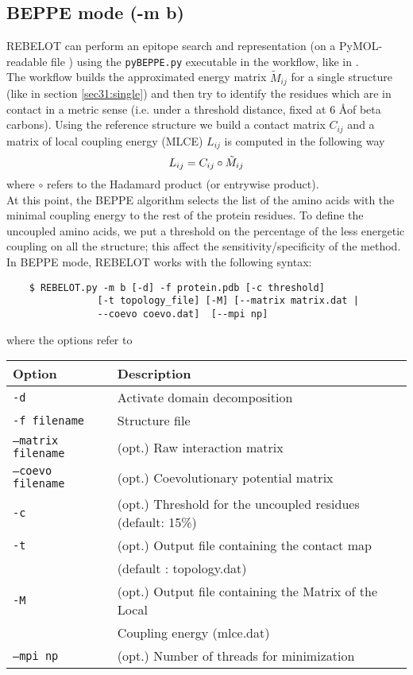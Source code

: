 \documentclass[a4paper,12pt]{book}
\begin{document}
\subsection{BEPPE mode (-m b)}
\label{sec34:beppe}
REBELOT can perform an epitope search and representation (on a PyMOL-readable file \cite{PyMOL}) using the \texttt{pyBEPPE.py} executable in the workflow, like in \cite{scarabelli2010predicting,peri2015prediction}. \\
The workflow builds the approximated energy matrix $\tilde{M}_{ij}$ for a single structure (like in section \ref{sec31:single}) and then try to identify the residues which are in contact in a metric sense (i.e. under a threshold distance, fixed at 6 \AA of beta carbons). Using the reference structure we build a contact matrix $C_{ij}$ and a matrix of local coupling energy (MLCE) $L_{ij}$ is computed in the following way
\begin{equation}
L_{ij} = C_{ij} \circ \tilde{M}_{ij} \notag
\end{equation}
where $\circ$ refers to the Hadamard product (or entrywise product). \\
At this point, the BEPPE algorithm selects the list of the amino acids with the minimal coupling energy to the rest of the protein residues. To define the uncoupled amino acids, we put a threshold on the percentage of the less energetic coupling on all the structure; this affect the sensitivity/specificity of the method. \\
In BEPPE mode, REBELOT works with the following syntax:
\begin{lstlisting}
	$ REBELOT.py -m b [-d] -f protein.pdb [-c threshold] 
				[-t topology_file] [-M] [--matrix matrix.dat | 
				--coevo coevo.dat]  [--mpi np] 
\end{lstlisting}
where the options refer to
\begin{center}
\begin{tabular}{lll}
\toprule
Option & Description\\
\midrule
\texttt{-d}  & Activate domain decomposition \\
\texttt{-f filename}   & Structure file \\
\texttt{--matrix filename} &(opt.) Raw interaction matrix \\
\texttt{--coevo filename} &(opt.) Coevolutionary potential matrix \\
\texttt{-c}  & (opt.) Threshold for the uncoupled residues (default: 15\%)  \\
\texttt{-t}  & (opt.) Output file containing the contact map \\
&(default : topology.dat)\\
\texttt{-M}  & (opt.) Output file containing the Matrix of the Local \\
& Coupling  energy (mlce.dat)\\
\texttt{--mpi np}  & (opt.) Number of threads for minimization \\
\bottomrule
\end{tabular}
\end{center}
\end{document}
